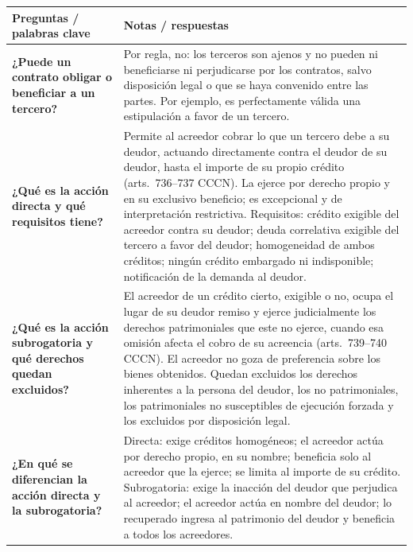 \documentclass[12pt,oneside]{book}
\begin{document}
\begin{table}[H]
\centering
\small
\renewcommand{\arraystretch}{1.3}
\begin{tabularx}{\textwidth}{
    >{\raggedright\arraybackslash}p{}
    >{\raggedright\arraybackslash}X
}
\toprule
\textbf{Preguntas / palabras clave} &
\textbf{Notas / respuestas} \\
\midrule

\textbf{¿Puede un contrato obligar o beneficiar a un tercero?} &
Por regla, no: los terceros son ajenos y no pueden ni beneficiarse ni perjudicarse por los contratos, salvo disposición legal o que se haya convenido entre las partes. Por ejemplo, es perfectamente válida una estipulación a favor de un tercero. \\

\midrule

\textbf{¿Qué es la acción directa y qué requisitos tiene?} &
Permite al acreedor cobrar lo que un tercero debe a su deudor, actuando directamente contra el deudor de su deudor, hasta el importe de su propio crédito (arts.~736--737 CCCN). La ejerce por derecho propio y en su exclusivo beneficio; es excepcional y de interpretación restrictiva. Requisitos: crédito exigible del acreedor contra su deudor; deuda correlativa exigible del tercero a favor del deudor; homogeneidad de ambos créditos; ningún crédito embargado ni indisponible; notificación de la demanda al deudor. \\

\midrule

\textbf{¿Qué es la acción subrogatoria y qué derechos quedan excluidos?} &
El acreedor de un crédito cierto, exigible o no, ocupa el lugar de su deudor remiso y ejerce judicialmente los derechos patrimoniales que este no ejerce, cuando esa omisión afecta el cobro de su acreencia (arts.~739--740 CCCN). El acreedor no goza de preferencia sobre los bienes obtenidos. Quedan excluidos los derechos inherentes a la persona del deudor, los no patrimoniales, los patrimoniales no susceptibles de ejecución forzada y los excluidos por disposición legal. \\

\midrule

\textbf{¿En qué se diferencian la acción directa y la subrogatoria?} &
Directa: exige créditos homogéneos; el acreedor actúa por derecho propio, en su nombre; beneficia solo al acreedor que la ejerce; se limita al importe de su crédito. Subrogatoria: exige la inacción del deudor que perjudica al acreedor; el acreedor actúa en nombre del deudor; lo recuperado ingresa al patrimonio del deudor y beneficia a todos los acreedores. \\


\end{tabularx}
\end{table}
\end{document}
